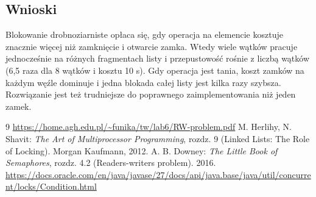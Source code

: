 \documentclass[11pt,a4paper]{article}
\begin{document}
\subsection{Wnioski}
Blokowanie drobnoziarniste opłaca się, gdy operacja na elemencie kosztuje znacznie więcej niż
zamknięcie i otwarcie zamka. Wtedy wiele wątków pracuje jednocześnie na różnych fragmentach listy
i przepustowość rośnie z liczbą wątków (6,5 raza dla 8 wątków i kosztu 10 \textmu s). Gdy operacja
jest tania, koszt zamków na każdym węźle dominuje i jedna blokada całej listy jest kilka razy szybsza.
Rozwiązanie jest też trudniejsze do poprawnego zaimplementowania niż jeden zamek.

\begin{thebibliography}{9}
     \url{https://home.agh.edu.pl/~funika/tw/lab6/RW-problem.pdf}
     M. Herlihy, N. Shavit: \textit{The Art of Multiprocessor Programming}, rozdz. 9 (Linked Lists: The Role of Locking). Morgan Kaufmann, 2012.
     A. B. Downey: \textit{The Little Book of Semaphores}, rozdz. 4.2 (Readers-writers problem). 2016.
     \url{https://docs.oracle.com/en/java/javase/27/docs/api/java.base/java/util/concurrent/locks/Condition.html}
\end{thebibliography}
\end{document}
